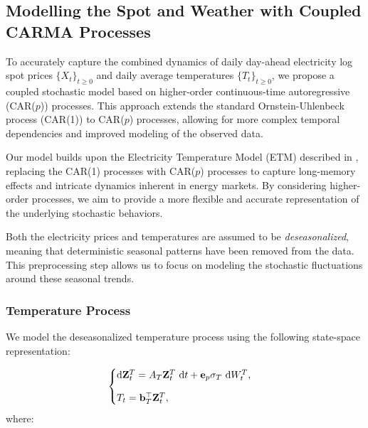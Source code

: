 \documentclass[10pt,a4paper,reqno]{amsart}
\theoremstyle{example}
\newcommand*\D{\mathop{}\!\textnormal{d}}
\begin{document}
\subsection{Modelling the Spot and Weather with Coupled CARMA Processes}

To accurately capture the combined dynamics of daily day-ahead electricity log spot prices $\{X_t\}_{t \geq 0}$ and daily average temperatures $\{T_t\}_{t \geq 0}$, we propose a coupled stochastic model based on higher-order continuous-time autoregressive (CAR($p$)) processes. This approach extends the standard Ornstein-Uhlenbeck process (CAR(1)) to CAR($p$) processes, allowing for more complex temporal dependencies and improved modeling of the observed data.

Our model builds upon the Electricity Temperature Model (ETM) described in \cite{reference}, replacing the CAR(1) processes with CAR($p$) processes to capture long-memory effects and intricate dynamics inherent in energy markets. By considering higher-order processes, we aim to provide a more flexible and accurate representation of the underlying stochastic behaviors.

Both the electricity prices and temperatures are assumed to be \emph{deseasonalized}, meaning that deterministic seasonal patterns have been removed from the data. This preprocessing step allows us to focus on modeling the stochastic fluctuations around these seasonal trends.

\subsubsection{Temperature Process}

We model the deseasonalized temperature process using the following state-space representation:

\begin{align}
\begin{cases}
\D \mathbf{Z}_t^T = A_T \mathbf{Z}_t^T \, \D t + \mathbf{e}_p \sigma_T \, \D W_t^T, \\[2ex]
T_t = \mathbf{b}_T^\top \mathbf{Z}_t^T,
\end{cases} \label{eq:temperature-process}
\end{align}
where:
\end{document}
